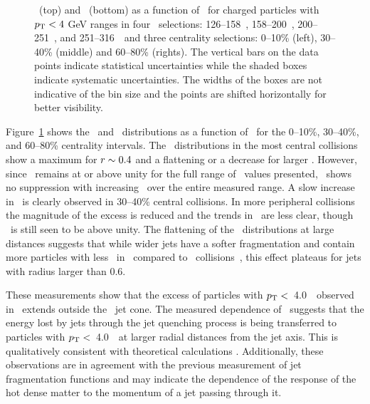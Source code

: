 \begin{figure}
{\begin{tabular}{ccc}
\end{tabular} }
\caption{\RTheta\ (top) and \RP\ (bottom) as a function of \rvar\ for charged particles with $\mbox{$p_{\mathrm{T}}$} < 4$ GeV ranges in four \ptjet\ selections: 126--158~\GeV, 158--200~\GeV, 200--251~\GeV, and 251--316~\GeV\ and three centrality selections: 0--10\% (left), 30--40\% (middle) and 60--80\% (rights).
The vertical bars on the data points indicate statistical uncertainties while the shaded boxes indicate systematic uncertainties.
The widths of the boxes are not indicative of the bin size and the points are shifted horizontally for better visibility.}
\label{fig:RPRT}
\end{figure}


Figure~\ref{fig:RPRT} shows the \RTheta\ and \RP\ distributions as a function of \rvar\ for the 0--10\%, 30--40\%, and 60--80\% centrality intervals.
The \RTheta\ distributions in the most central collisions show a maximum for $\mbox{$r$} \sim 0.4$ and a flattening or a decrease for larger \rvar.
However, since \RTheta\ remains at or above unity for the full range of \rvar\ values presented, \RP\ shows no suppression with increasing \rvar\ over the entire measured range.
A slow increase in \RP\ is clearly observed in 30--40\% central collisions.
In more peripheral collisions the magnitude of the excess is reduced and the trends in \RTheta\ are less clear, though \RP\ is still seen to be above unity.
The flattening of the \RP\ distributions at large distances suggests that while wider jets have a softer fragmentation and contain more particles with less \pt\ in \pbpb\ compared to \pp\ \mbox{collisions \cite{Chesler:2015nqz, Hulcher:2017cpt}}, this effect plateaus for jets with radius larger than 0.6.

These measurements show that the excess of particles with $\mbox{$p_{\mathrm{T}}$} <$~4.0~\GeV\ observed in~\cite{PhysRevC.98.024908} extends outside the \RFour\ jet cone.
The measured dependence of \RDptr\ suggests that the energy lost by jets through the jet quenching process is being transferred to particles with $\mbox{$p_{\mathrm{T}}$} <$~4.0~\GeV\ at larger radial distances from the jet axis.
This is qualitatively consistent with theoretical calculations \mbox{\cite{Blaizot:2014ula}}.
Additionally, these observations are in agreement with the previous measurement of jet fragmentation functions \cite{Chatrchyan:2014ava, Sirunyan:2018jqr, Aaboud:2017bzv, PhysRevC.98.024908} and may indicate the dependence of the response of the hot dense matter to the momentum of a jet passing through it.

\FloatBarrier

